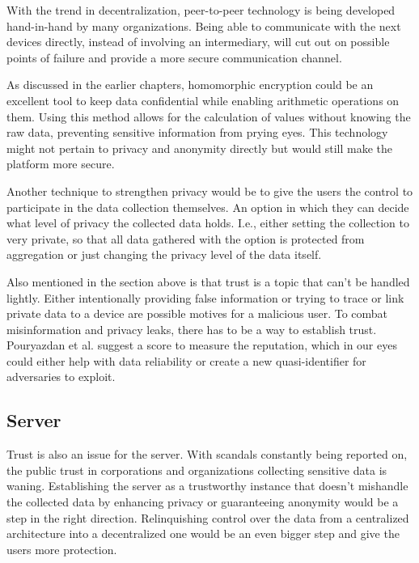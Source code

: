 With the trend in decentralization, peer-to-peer technology is being developed hand-in-hand by many organizations. Being able to communicate with the next devices directly, instead of involving an intermediary, will cut out on possible points of failure and provide a more secure communication channel.

As discussed in the earlier chapters, homomorphic encryption could be an excellent tool to keep data confidential while enabling arithmetic operations on them. Using this method allows for the calculation of values without knowing the raw data, preventing sensitive information from prying eyes. This technology might not pertain to privacy and anonymity directly but would still make the platform more secure.

Another technique to strengthen privacy would be to give the users the control to participate in the data collection themselves. An option in which they can decide what level of privacy the collected data holds. I.e., either setting the collection to very private, so that all data gathered with the option is protected from aggregation or just changing the privacy level of the data itself.

Also mentioned in the section above is that trust is a topic that can't be handled lightly. Either intentionally providing false information or trying to trace or link private data to a device are possible motives for a malicious user. To combat misinformation and privacy leaks, there has to be a way to establish trust. Pouryazdan et al.
suggest a score to measure the reputation, which in our eyes could either help with data reliability or create a new quasi-identifier for adversaries to exploit.
 
\subsection{Server}
Trust is also an issue for the server. With scandals constantly being reported on, the public trust in corporations and organizations collecting sensitive data is waning. Establishing the server as a trustworthy instance that doesn't mishandle the collected data by enhancing privacy or guaranteeing anonymity would be a step in the right direction. Relinquishing control over the data from a centralized architecture into a decentralized one would be an even bigger step and give the users more protection.

